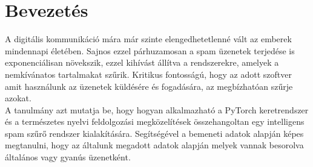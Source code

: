 ﻿\section{Bevezetés}
A digitális kommunikáció mára már szinte elengedhetetlenné vált az emberek mindennapi életében. Sajnos ezzel párhuzamosan a spam üzenetek terjedése is exponenciálisan növekszik, ezzel kihívást állítva a rendszerekre, amelyek a nemkívánatos tartalmakat szűrik. Kritikus fontosságú, hogy az adott szoftver amit használunk az üzenetek küldésére és fogadására, az megbízhatóan szűrje azokat. \\

A tanulmány azt mutatja be, hogy hogyan alkalmazható a PyTorch keretrendszer és a természetes nyelvi feldolgozási megközelítések összehangoltan egy intelligens spam szűrő rendszer kialakítására. Segítségével a bemeneti adatok alapján képes megtanulni, hogy az általunk megadott adatok alapján melyek vannak besorolva általános vagy gyanús üzenetként.
